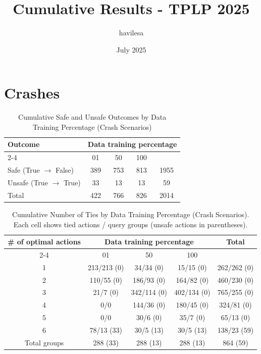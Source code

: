 \documentclass{article}
\title{Cumulative Results - TPLP 2025}
\author{havilesa}
\date{July 2025}
\begin{document}
\maketitle

\section{Crashes}
\begin{table}[h]
\centering
\caption{Cumulative Safe and Unsafe Outcomes by Data Training Percentage (Crash Scenarios)}
\begin{tabular}{l|ccc|c}
\toprule
\multirow{2}{*}{Outcome} & \multicolumn{5}{c|}{Data training percentage} & \multirow{2}{*}{Total} \\
\cmidrule{2-4}
 & 01 & 50 & 100 & \\
\midrule
Safe (True $\rightarrow$ False) & 389 & 753 & 813 & 1955 \\ 
Unsafe (True $\rightarrow$ True) & 33 & 13 & 13 & 59 \\ 
\midrule
Total & 422 & 766 & 826 & 2014 \\ 
\bottomrule
\end{tabular}
\end{table}

\begin{table}[h]
\centering
\caption{Cumulative Number of Ties by Data Training Percentage (Crash Scenarios).
Each cell shows tied actions / query groups (unsafe actions in parentheses).}
\begin{tabular}{c|ccc|c}
\toprule
\multirow{2}{*}{\# of optimal actions} & \multicolumn{3}{c|}{Data training percentage} & \multirow{2}{*}{Total} \\
\cmidrule{2-4}
 & 01 & 50 & 100 & \\
\midrule
1 & 213/213 (0) & 34/34 (0) & 15/15 (0) & 262/262 (0) \\ 
2 & 110/55 (0) & 186/93 (0) & 164/82 (0) & 460/230 (0) \\ 
3 & 21/7 (0) & 342/114 (0) & 402/134 (0) & 765/255 (0) \\ 
4 & 0/0 & 144/36 (0) & 180/45 (0) & 324/81 (0) \\ 
5 & 0/0 & 30/6 (0) & 35/7 (0) & 65/13 (0) \\ 
6 & 78/13 (33) & 30/5 (13) & 30/5 (13) & 138/23 (59) \\ 
\midrule
Total groups & 288 (33) & 288 (13) & 288 (13) & 864 (59) \\ 
\bottomrule
\end{tabular}
\end{table}
\end{document}
